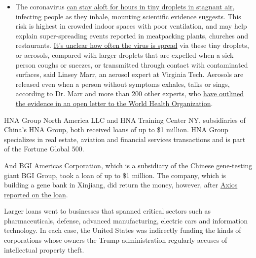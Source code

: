 \begin{itemize}
  \begin{itemize}
  \tightlist
  \item
    The coronavirus
    \href{https://www.nytimes.com/2020/07/04/health/239-experts-with-one-big-claim-the-coronavirus-is-airborne.html?action=click\&pgtype=Article\&state=default\&region=MAIN_CONTENT_3\&context=storylines_faq}{can
    stay aloft for hours in tiny droplets in stagnant air}, infecting
    people as they inhale, mounting scientific evidence suggests. This
    risk is highest in crowded indoor spaces with poor ventilation, and
    may help explain super-spreading events reported in meatpacking
    plants, churches and restaurants.
    \href{https://www.nytimes.com/2020/07/06/health/coronavirus-airborne-aerosols.html?action=click\&pgtype=Article\&state=default\&region=MAIN_CONTENT_3\&context=storylines_faq}{It's
    unclear how often the virus is spread} via these tiny droplets, or
    aerosols, compared with larger droplets that are expelled when a
    sick person coughs or sneezes, or transmitted through contact with
    contaminated surfaces, said Linsey Marr, an aerosol expert at
    Virginia Tech. Aerosols are released even when a person without
    symptoms exhales, talks or sings, according to Dr. Marr and more
    than 200 other experts, who
    \href{https://academic.oup.com/cid/article/doi/10.1093/cid/ciaa939/5867798}{have
    outlined the evidence in an open letter to the World Health
    Organization}.
  \end{itemize}
\end{itemize}

HNA Group North America LLC and HNA Training Center NY, subsidiaries of
China's HNA Group, both received loans of up to \$1 million. HNA Group
specializes in real estate, aviation and financial services transactions
and is part of the Fortune Global 500.

And BGI Americas Corporation, which is a subsidiary of the Chinese
gene-testing giant BGI Group, took a loan of up to \$1 million. The
company, which is building a gene bank in Xinjiang, did return the
money, however, after
\href{https://www.axios.com/chinese-biotech-us-subsidiary-ppp-loan-8134a863-3779-46c4-9190-ceca54ba00ca.html}{Axios
reported on the loan}.

Larger loans went to businesses that spanned critical sectors such as
pharmaceuticals, defense, advanced manufacturing, electric cars and
information technology. In each case, the United States was indirectly
funding the kinds of corporations whose owners the Trump administration
regularly accuses of intellectual property theft.

